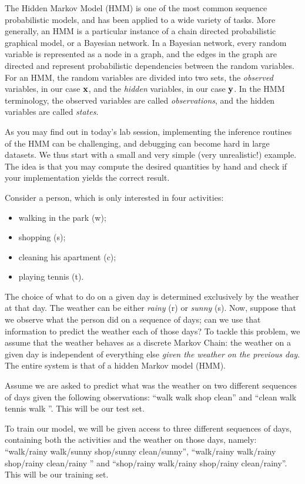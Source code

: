 
The Hidden Markov Model (HMM) is one of the most common sequence
probabilistic models, and has been applied to a wide variety of
tasks. More generally, an HMM is a particular instance of  a chain
directed probabilistic graphical model, or a Bayesian network.  In a
Bayesian network, every random variable is represented as a node in a
graph, and the edges in the graph are directed and represent
probabilistic dependencies between the random variables. For an HMM, the random variables are divided into two sets, the 
\emph{observed} variables, in our case 
$\mathbf{x}$, and the \emph{hidden} variables, in our case $\mathbf{y}$. In the HMM
terminology, the observed variables are called \emph{observations}, and the
hidden variables are called \emph{states}. 

As you may find out in today's lab session, 
implementing the inference routines of the HMM can be challenging, 
and debugging can become hard in large
datasets. We thus start with a small and very
simple (very unrealistic!) example. The idea is that you may compute the desired
quantities by hand and check if your implementation yields the correct result. 

\begin{example}

Consider a person, which is only interested in four activities: 
\begin{itemize}
\item walking in
the park (w);
\item shopping (s);
\item cleaning his apartment (c);
\item playing tennis (t).
\end{itemize}
The choice of what to do on a given day is determined exclusively by the weather at that day. The
weather can be either \emph{rainy} (r) or \emph{sunny} (s). 
Now, suppose that we observe what the person did on a sequence of days; 
can we use that information to predict the weather each of those days? 
To tackle this problem, we assume 
that the weather behaves as a discrete Markov Chain: the weather on a
given day is independent of everything else \emph{given 
the weather on the previous day}. The entire system is that of a hidden Markov model (HMM).

Assume we are asked to predict what was the weather on two different
sequences of days given the following observations: ``walk walk shop
clean''  and ``clean walk tennis walk ''. This will be our test set.


To train our model, we will be given access to three different sequences of
days, containing both the activities and the weather on those days, namely: 
``walk/rainy walk/sunny shop/sunny
clean/sunny'', ``walk/rainy walk/rainy shop/rainy clean/rainy '' and ``shop/rainy walk/rainy shop/rainy clean/rainy''. This
will be our training set.
 \end{example}

